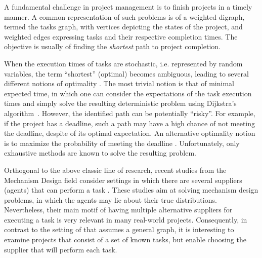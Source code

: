 \documentclass[letterpaper]{article} %
\newcommand\Roni[1]{\nb{\textbf{Roni:}}{blue}{#1}}
\begin{document}

A fundamental challenge in project management is to finish projects in a timely manner. A common representation of such problems is of a weighted digraph, termed the tasks graph, with vertices depicting the states of the project, and weighted edges expressing tasks and their respective completion times. The objective is usually of finding the \emph{shortest} path to project completion. 

When the execution times of tasks are stochastic, i.e. represented by random variables, the term ``shortest'' (optimal) becomes ambiguous, leading to several different notions of optimality \cite{loui1983optimal}. 
The most trivial notion is that of minimal expected time, in which one can consider the expectations of the task execution times and simply solve the resulting deterministic problem using Dijkstra's algorithm~\cite{dijkstra1959note}. However, the identified path can be potentially ``risky''. For example, if the project has a deadline, such a path may have a high chance of not meeting the deadline, despite  of its optimal expectation. An alternative optimality notion is to maximize the probability of meeting the deadline \cite{frank1969shortest}. Unfortunately, only exhaustive methods are known to solve the resulting problem. %

Orthogonal to the above classic line of research, recent studies from the Mechanism Design field consider settings in which there are several suppliers (agents) that can perform a task \cite{porter2008fault,conitzer2014mechanism}. These studies aim at solving mechanism design problems, in which the agents may lie about their true distributions. Nevertheless, their main motif of having multiple alternative suppliers for executing a task is very relevant in many real-world projects. Consequently, in contrast to the setting of \citeauthor{loui1983optimal} that assumes a general graph, it is interesting to examine projects that consist of a set of known tasks, but enable choosing the supplier that will perform each task.
\end{document}
